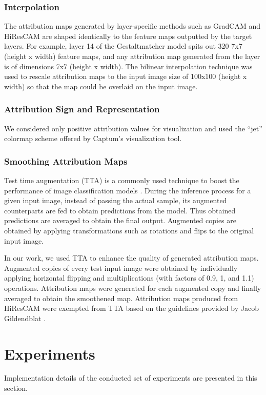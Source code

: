 \documentclass[../report.tex]{subfiles}
\begin{document}
	\subsubsection{Interpolation}
	The attribution maps generated by layer-specific methods such as GradCAM and HiResCAM are shaped identically to the feature maps outputted by the target layers. For example, layer 14 of the Gestaltmatcher model spits out 320 7x7 (height x width) feature maps, and any attribution map generated from the layer is of dimensions 7x7 (height x width). The bilinear interpolation technique \cite{bovik2009essential} was used to rescale attribution maps to the input image size of 100x100 (height x width) so that the map could be overlaid on the input image.
	\subsubsection{Attribution Sign and Representation}
	We considered only positive attribution values for visualization and used the \enquote{jet} colormap scheme offered by Captum's visualization tool.
	\subsubsection{Smoothing Attribution Maps}
	Test time augmentation (TTA) is a commonly used technique to boost the performance of image classification models \cite{simonyan2014very}. During the inference process for a given input image, instead of passing the actual sample, its augmented counterparts are fed to obtain predictions from the model. Thus obtained predictions are averaged to obtain the final output. Augmented copies are obtained by applying transformations such as rotations and flips to the original input image.
	
	In our work, we used TTA to enhance the quality of generated attribution maps. Augmented copies of every test input image were obtained by individually applying horizontal flipping and multiplications (with factors of 0.9, 1, and 1.1) operations. Attribution maps were generated for each augmented copy and finally averaged to obtain the smoothened map. Attribution maps produced from HiResCAM were exempted from TTA based on the guidelines provided by Jacob Gildendblat \cite{jacobgilpytorchcam}.
	
    \section{Experiments}
        \noindent
    Implementation details of the conducted set of experiments are presented in this section.
\end{document}
